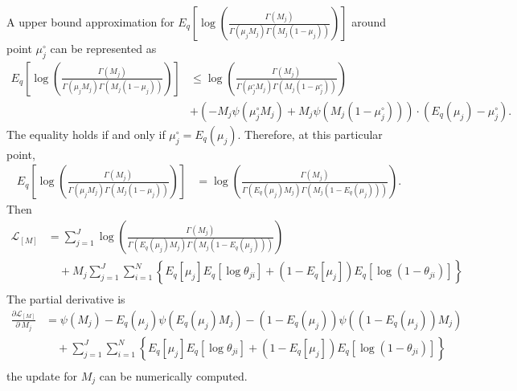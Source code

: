 \documentclass[11pt,reqno]{amsart}
\begin{document}
%
A upper bound approximation for $ E_q  \left[ \log \left( \frac{ \Gamma(M_j) } { \Gamma(\mu_j M_j) \Gamma(M_j (1-\mu_j)) }\right) \right] $ around point $ \mu_j^{\circ} $ can be represented as
\begin{equation}
\begin{split}
E_q  \left[ \log \left( \frac{ \Gamma(M_j) } { \Gamma(\mu_j M_j) \Gamma(M_j (1-\mu_j)) }\right) \right] &\leq \log\left( \frac{\Gamma(M_j)}{\Gamma(\mu_j^{\circ} M_j) \Gamma(M_j (1-\mu_j^{\circ} ))}\right) \\
\quad &+ \left( -M_j \psi (\mu_j^{\circ} M_j) + M_j \psi(M_j (1-\mu_j^{\circ} ))\right) \cdot (E_q(\mu_j)-\mu_j^{\circ}).\nonumber
\end{split}
\end{equation}
%
The equality holds if and only if $ \mu_j^{\circ} =E_q(\mu_j) $. Therefore, at this particular point,
\begin{equation}
\begin{split}
E_q  \left[ \log \left( \frac{ \Gamma(M_j) } { \Gamma(\mu_j M_j) \Gamma(M_j (1-\mu_j)) }\right) \right] &= \log\left( \frac{\Gamma(M_j)}{\Gamma(E_q(\mu_j) M_j) \Gamma(M_j (1-E_q(\mu_j) ))}\right).\nonumber
\end{split}
\end{equation}
%
Then
\begin{equation}
\begin{split}
\label{M}
\mathcal{L}_{{[M]}}
&= \sum_{j=1}^{J} \log\left( \frac{\Gamma(M_j)}{\Gamma(E_q(\mu_j) M_j) \Gamma(M_j (1-E_q(\mu_j) ))}\right) \\
&\quad + M_j \sum_{j=1}^{J} \sum_{i=1}^{N} \left\lbrace E_q \left[ \mu_j \right] E_q \left[ \log \theta_{ji} \right] + \left( 1 - E_q\left[ \mu_j \right]  \right) E_q\left[ \log \left( 1 - \theta_{ji}\right) \right] \right\rbrace \\
\end{split}
\end{equation}
%
The partial derivative is
\begin{equation}
\begin{split}
\frac{\partial \mathcal{L}_{{[M]}} }{\partial \ M_j}
&= \psi(M_j) - E_q(\mu_j) \psi(E_q(\mu_j) M_j)
- (1-E_q(\mu_j)) \psi((1-E_q(\mu_j)) M_j) \\
&\quad + \sum_{j=1}^{J} \sum_{i=1}^{N} \left\lbrace E_q \left[ \mu_j \right] E_q \left[ \log \theta_{ji} \right]
+ \left( 1 - E_q\left[ \mu_j \right]  \right) E_q\left[ \log \left( 1 - \theta_{ji}\right) \right] \right\rbrace \\
\end{split}
\end{equation}
%
the update for $ M_j $ can be numerically computed.
\end{document}
